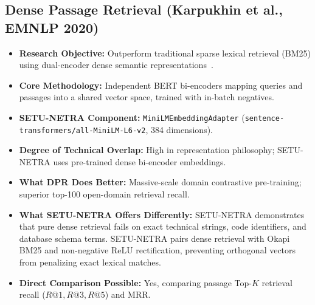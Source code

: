 \documentclass[11pt,a4paper]{article}
\begin{document}
\subsection{Dense Passage Retrieval (Karpukhin et al., EMNLP 2020)}
\begin{itemize}[leftmargin=*]
    \item \textbf{Research Objective:} Outperform traditional sparse lexical retrieval (BM25) using dual-encoder dense semantic representations~\cite{Karpukhin2020DPR}.
    \item \textbf{Core Methodology:} Independent BERT bi-encoders mapping queries and passages into a shared vector space, trained with in-batch negatives.
    \item \textbf{SETU-NETRA Component:} \texttt{MiniLMEmbeddingAdapter} (\texttt{sentence-transformers/all-MiniLM-L6-v2}, 384 dimensions).
    \item \textbf{Degree of Technical Overlap:} High in representation philosophy; SETU-NETRA uses pre-trained dense bi-encoder embeddings.
    \item \textbf{What DPR Does Better:} Massive-scale domain contrastive pre-training; superior top-100 open-domain retrieval recall.
    \item \textbf{What SETU-NETRA Offers Differently:} SETU-NETRA demonstrates that pure dense retrieval fails on exact technical strings, code identifiers, and database schema terms. SETU-NETRA pairs dense retrieval with Okapi BM25 and non-negative ReLU rectification, preventing orthogonal vectors from penalizing exact lexical matches.
    \item \textbf{Direct Comparison Possible:} Yes, comparing passage Top-$K$ retrieval recall ($R@1, R@3, R@5$) and MRR.
\end{itemize}

\end{document}
